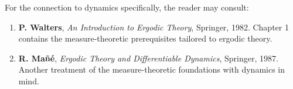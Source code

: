 For the connection to dynamics specifically, the reader may consult:

\begin{enumerate}[nosep]
  \item \textbf{P. Walters}, \textit{An Introduction to Ergodic Theory}, Springer, 1982. Chapter 1 contains the measure-theoretic prerequisites tailored to ergodic theory.

  \item \textbf{R. Ma\~{n}\'{e}}, \textit{Ergodic Theory and Differentiable Dynamics}, Springer, 1987. Another treatment of the measure-theoretic foundations with dynamics in mind.
\end{enumerate}

